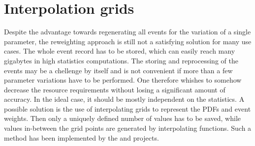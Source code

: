 \section{Interpolation grids}
Despite the advantage towards regenerating all events for the variation of a single parameter, the reweighting approach is still not a satisfying solution for many use cases.
The whole event record has to be stored, which can easily reach many gigabytes in high statistics computations.
The storing and reprocessing of the events may be a chellenge by itself and is not convenient if more than a few parameter variations have to be performed.
One therefore whishes to somehow decrease the resource requirements without losing a significant amount of accuracy.
In the ideal case, it should be mostly independent on the statistics.
A possible solution is the use of interpolating grids to represent the PDFs and event weights.
Then only a uniquely defined number of values has to be saved, while values in-between the grid points are generated by interpolating functions.
Such a method has been implemented by the \appl{} \cite{applgrid2010} and \fnlo{} \cite{fastnlo2006,fastnlo2011} projects.

